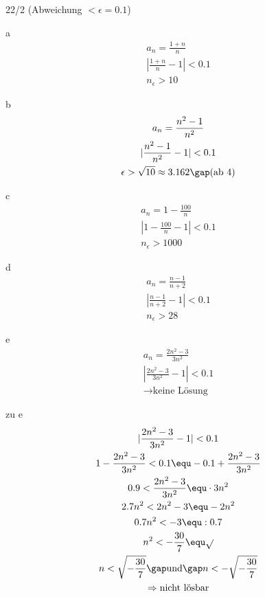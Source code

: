\begin{exercise}{22/2}
  (Abweichung $< \epsilon = 0.1$)
  \item [a]
  \begin{gather*}
    a_n = \frac{1 + n}{n} \\
    |\frac{1 + n}{n} - 1| < 0.1 \\
    n_\epsilon > 10
  \end{gather*}
  \item [b]
  \begin{gather*}
    a_n = \frac{n^2 - 1}{n^2} \\
    |\frac{n^2 - 1}{n^2} - 1| < 0.1 \\
    \epsilon > \sqrt{10} \approx 3.162\gap \text{(ab 4)}
  \end{gather*}
  \item [c]
  \begin{gather*}
    a_n = 1 - \frac{100}{n} \\
    |1 - \frac{100}{n} - 1| < 0.1 \\
    n_\epsilon > 1000
  \end{gather*}
  \item [d]
  \begin{gather*}
    a_n = \frac{n - 1}{n + 2} \\
    |\frac{n - 1}{n + 2} - 1| < 0.1 \\
    n_\epsilon > 28
  \end{gather*}
  \item [e]
  \begin{gather*}
    a_n = \frac{2n^2 - 3}{3n^2} \\
    |\frac{2n^2 - 3}{3n^2} - 1| < 0.1 \\
    \rightarrow \text{keine Lösung}
  \end{gather*}
  \item [zu e]
  \begin{gather*}
    |\frac{2n^2 - 3}{3n^2} - 1| < 0.1 \\
    1 - \frac{2n^2 - 3}{3n^2} < 0.1 \equ -0.1 + \frac{2n^2 - 3}{3n^2} \\
    0.9 < \frac{2n^2 - 3}{3n^2} \equ \cdot 3n^2 \\
    2.7n^2 < 2n^2 - 3 \equ - 2n^2 \\
    0.7n^2 < -3 \equ : 0.7 \\
    n^2 < -\frac{30}{7} \equ \sqrt{} \\
    n < \sqrt{-\frac{30}{7}} \gap\text{und}\gap n < -\sqrt{-\frac{30}{7}} \\
    \Rightarrow \text{nicht lösbar}
  \end{gather*}
\end{exercise}
